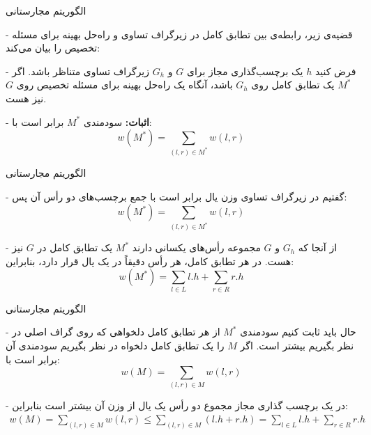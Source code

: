 \begin{itemframe}{الگوریتم مجارستانی}
\item[-]
قضیه‌ی زیر، رابطه‌ی بین تطابق کامل در زیرگراف تساوی و راه‌حل بهینه برای مسئله تخصیص را بیان می‌کند:
\item[-]
فرض کنید $h$ یک برچسب‌گذاری مجاز برای $G$ و $G_h$ زیرگراف تساوی متناظر باشد. اگر $M^*$ یک تطابق کامل روی $G_h$ باشد، آنگاه یک راه‌حل بهینه برای مسئله تخصیص روی $G$ نیز هست.
\item[-]
\textbf{اثبات:}
سودمندی $M^*$ برابر است با:
$$
w(M^\ast) = \sum_{(l, r) \in M^\ast} w(l, r)
$$

\end{itemframe}


\begin{itemframe}{الگوریتم مجارستانی}
\item[-]
گفتیم در زیرگراف تساوی وزن یال برابر است با جمع برچسب‌های دو رأس آن پس:
$$
w(M^\ast) = \sum_{(l, r) \in M^\ast} w(l, r)
$$
\item[-]
از آنجا که $G_h$ و $G$ مجموعه رأس‌های یکسانی دارند $M^\ast$ یک تطابق کامل در $G$ نیز هست. در هر تطابق کامل، هر رأس دقیقاً در یک یال قرار دارد، بنابراین:
$$
w(M^\ast) = \sum_{l \in L} l.h + \sum_{r \in R} r.h
$$
\end{itemframe}


\begin{itemframe}{الگوریتم مجارستانی}
\item[-]
حال باید ثابت کنیم سودمندی $M^\ast$ از هر تطابق کامل دلخواهی که روی گراف اصلی در نظر بگیریم بیشتر است. اگر $M$  را یک تطابق کامل دلخواه در نظر بگیریم سودمندی آن برابر است با:
$$
w(M) = \sum_{(l, r) \in M} w(l, r)
$$
\item[-]
در یک برچسب گذاری مجاز مجموع دو رأس یک یال از وزن آن بیشتر است بنابراین:
\begin{align*}
w(M) = \sum_{(l, r) \in M} w(l, r) \leq \sum_{(l, r) \in M} (l.h + r.h) = \sum_{l \in L} l.h + \sum_{r \in R} r.h
\end{align*}
\end{itemframe}


